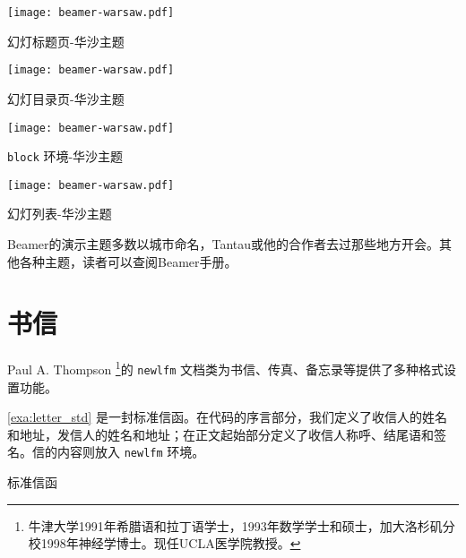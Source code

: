 \begin{example}[h]
\begin{Demo}
\centering
\texttt{[image: beamer-warsaw.pdf]}
\end{Demo}
\caption{幻灯标题页-华沙主题}
\label{exa:beamer_title_warsaw}
\end{example}

\begin{example}[!h]
\begin{Demo}
\centering
\texttt{[image: beamer-warsaw.pdf]}
\end{Demo}
\caption{幻灯目录页-华沙主题}
\label{exa:beamer_toc_warsaw}
\end{example}

\begin{example}[h]
\begin{Demo}
\centering
\texttt{[image: beamer-warsaw.pdf]}
\end{Demo}
\caption{\texttt{block} 环境-华沙主题}
\label{exa:beamer_block_warsaw}
\end{example}

\begin{example}[!h]
\begin{Demo}
\centering
\texttt{[image: beamer-warsaw.pdf]}
\end{Demo}
\caption{幻灯列表-华沙主题}
\label{exa:beamer_list_warsaw}
\end{example}

Beamer的演示主题多数以城市命名，Tantau\indexTantau{}或他的合作者去过那些地方开会。其他各种主题，读者可以查阅Beamer手册。

\section{书信}

Paul A. Thompson\indexThompson{} \footnote{牛津大学1991年希腊语和拉丁语学士，1993年数学学士和硕士，加大洛杉矶分校1998年神经学博士。现任UCLA医学院教授。}的 \texttt{newlfm} \citep{Thompson_2009}文档类为书信、传真、备忘录等提供了多种格式设置功能。

\autoref{exa:letter_std} 是一封标准信函。在代码的序言部分，我们定义了收信人的姓名和地址，发信人的姓名和地址；在正文起始部分定义了收信人称呼、结尾语和签名。信的内容则放入 \texttt{newlfm} 环境。

\begin{example}[h]
\caption{标准信函}
\label{exa:letter_std}
\end{example}

